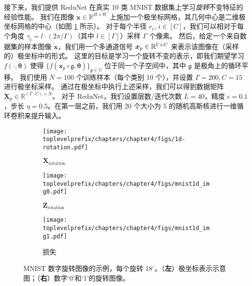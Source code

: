 \documentclass[../../book-main.tex]{subfiles}
\begin{document}
\begin{example}[数字的不变分类]
接下来，我们提供 ReduNet 在真实 10 类 MNIST 数据集上学习\textit{旋转}不变特征的经验性能。
我们在图像 $\bm{x}\in\mathbb{R}^{H\times W}$ 上施加一个极坐标网格，其几何中心是二维极坐标网格的中心（如图 \ref{fig:samples-invariant-1d-mnist-diagram} 所示）。
对于每个半径 $r_i$, $i \in [C]$，我们可以相对于每个角度 $\gamma_l =l\cdot({2\pi}/\Gamma)$（其中 $l \in [\Gamma]$）采样 $\Gamma$ 个像素。
然后，给定一个来自数据集的样本图像 $\bm{x}$，我们用一个多通道信号 $\bm{x}_p \in\mathbb{R}^{\Gamma\times C}$ 来表示该图像在（采样的）极坐标中的形式。
这里的目标是学习一个旋转不变的表示，即我们期望学习 $f(\cdot, \bm{\theta})$ 使得 $\{f(\bm{x}_p \circ \mathfrak{g}, \bm{\theta})\}_{\mathfrak{g} \in\mathbb{G}}$ 位于同一个子空间中，其中 $\mathfrak{g}$ 是极角上的循环平移。
我们使用 $N=100$ 个训练样本（每个类别 10 个），并设置 $\Gamma=200, C=15$ 进行极坐标采样。
通过在极坐标中执行上述采样，我们可以得到数据矩阵 $\bm{X}_p \in \mathbb{R}^{(\Gamma\cdot C) \times N}$。
对于 ReduNet，我们设置层数/迭代次数 $L=40$，精度 $\epsilon=0.1$，步长 $\eta=0.5$。在第一层之前，我们用 20 个大小为 5 的随机高斯核进行一维循环卷积来提升输入。

\begin{figure}[t]
    \begin{subfigure}[t]{0.3\textwidth}
        \centering
        \texttt{[image: \\toplevelprefix/chapters/chapter4/figs/1d-rotation.pdf]}
        \caption{$\bm{X}_{\text{rotation}}$}
    \end{subfigure}
    \hfill
    \begin{subfigure}[t]{0.3\textwidth}
        \centering
        \texttt{[image: \\toplevelprefix/chapters/chapter4/figs/mnist1d\_img0.pdf]}
        \caption{$\bm{Z}_{\text{rotation}}$}
    \end{subfigure}
    \hfill
    \begin{subfigure}[t]{0.3\textwidth}
        \centering
        \texttt{[image: \\toplevelprefix/chapters/chapter4/figs/mnist1d\_img1.pdf]}
        \caption{损失}
    \end{subfigure}
    \caption{\small MNIST 数字旋转图像的示例，每个旋转 18$^{\circ}$。（\textbf{左}）极坐标表示示意图；（\textbf{右}）数字‘0’和‘1’的旋转图像。}
    \label{fig:samples-invariant-1d-mnist-diagram}
\end{figure}



\end{example}
\end{document}
